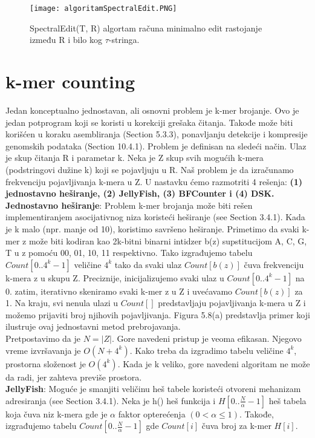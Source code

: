 \documentclass{article}
\begin{document}
\begin{figure}[h]
\centering
\texttt{[image: algoritamSpectralEdit.PNG]}
\caption{SpectralEdit(T, R) algortam računa minimalno edit rastojanje između R i bilo kog $\tau$-stringa.}
\end{figure}

\section{k-mer counting}

Jedan konceptualno jednostavan, ali osnovni problem je k-mer brojanje. Ovo je jedan potprogram koji se koristi u korekciji grešaka čitanja. Takođe može biti korišćen u koraku asembliranja (Section 5.3.3), ponavljanju detekcije i kompresije genomskih podataka (Section 10.4.1). Problem je definisan na sledeći način. Ulaz je skup čitanja R i parametar k. Neka je Z skup svih mogućih k-mera (podstringovi dužine k) koji se pojavljuju u R. Naš problem je da izračunamo frekvenciju pojavljivanja k-mera u Z. U nastavku ćemo razmotriti 4 rešenja: \textbf{(1) jednostavno heširanje, (2) JellyFish, (3) BFCounter i (4) DSK.}\\

\textbf{Jednostavno heširanje}: Problem k-mer brojanja može biti rešen implementiranjem asocijativnog niza koristeći heširanje (see Section 3.4.1). Kada je k malo (npr. manje od 10), koristimo savršeno heširanje. Primetimo da svaki k-mer z može biti kodiran kao 2k-bitni binarni intidzer b(z) supstitucijom A, C, G, T u z pomoću 00, 01, 10, 11 respektivno. Tako izgrađujemo tabelu $Count[0..4^k - 1]$ veličine $4^k$ tako da svaki ulaz $Count[b(z)]$ čuva frekvenciju k-mera z u skupu Z. Preciznije,  inicijalizujemo svaki ulaz u $Count[0..4^k - 1]$ na 0. zatim, iterativno skeniramo svaki k-mer z u Z i uvećavamo $Count[b(z)]$ za 1. Na kraju, svi nenula ulazi u $Count[]$ predstavljaju pojavljivanja k-mera u Z i možemo prijaviti broj njihovih pojavljivanja. Figura 5.8(a) predstavlja primer koji ilustruje ovaj jednostavni metod prebrojavanja.\\

Pretpostavimo da je $N = |Z|$. Gore navedeni pristup je veoma efikasan. Njegovo vreme izvršavanja je $O(N + 4^k)$. Kako treba da izgradimo tabelu veličine $4^k$, prostorna složenost je $O(4^k)$. Kada je k veliko, gore navedeni algoritam ne može da radi, jer zahteva previše prostora.\\

\textbf{JellyFish}: Moguće je smanjiti veličinu heš tabele koristeći otvoreni mehanizam adresiranja (see Section 3.4.1). Neka je h() heš funkcija i $H[0..\frac{N}{\alpha} - 1]$ heš tabela koja čuva niz k-mera gde je $\alpha$ faktor opterećenja $(0 < \alpha \leq 1)$. Takođe, izgrađujemo tabelu $Count[0..\frac{N}{\alpha} - 1]$ gde $Count[i]$ čuva broj za k-mer $H[i]$.\\
\end{document}
